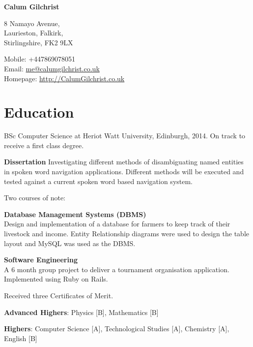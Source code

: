 \documentclass[11pt,a4paper]{article}
\def\name{Calum Gilchrist}
\renewenvironment{itemize}{
  \begin{list}{}{
    \setlength{\leftmargin}{1em}
    \setlength{\itemsep}{0.25em}
    \setlength{\parskip}{0pt}
    \setlength{\parsep}{0.25em}
    \renewcommand{\labelitemi}{$\bullet$}
  }
}{
  \end{list}
}
\begin{document}
%

\setlength{\parskip}{0em}


\centerline{\huge \bf \name}

\bigskip

\begin{minipage}[t]{0.495\textwidth}
  8 Namayo Avenue, \\
  Laurieston, Falkirk, \\
  Stirlingshire, FK2 9LX
\end{minipage}
\begin{minipage}[t]{0.495\textwidth}
  Mobile: +447869078051 \\
  Email: \href{mailto:me@calumgilchrist.co.uk}{me@calumgilchrist.co.uk} \\
  Homepage: \href{http://calumgilchrist.co.uk/}{http://CalumGilchrist.co.uk}
\end{minipage}

\section*{Education}

\begin{itemize}
    \item BSc Computer Science at Heriot Watt University, Edinburgh, 2014. On track to
      receive a first class degree.

    \begin{itemize}
        \item \textbf{Dissertation} Investigating different methods of disambiguating named
          entities in spoken word navigation applications. Different methods will be executed
          and tested against a current spoken word based navigation system.
        \item Two courses of note:
            \begin{itemize}
                \item \textbf{Database Management Systems (DBMS)} \\
                    Design and implementation of a database for farmers to keep track of their livestock and income.
                    Entity Relationship diagrams were used to design the table layout and MySQL was used as the DBMS.
                \item \textbf{Software Engineering} \\
                    A 6 month group project to deliver a tournament organisation application. Implemented using Ruby on Rails.
            \end{itemize}
        \item Received three Certificates of Merit. 
    \end{itemize}

    \item \textbf{Advanced Highers}: Physics [B], Mathematics [B]
    \item \textbf{Highers}: Computer Science [A], Technological Studies [A], Chemistry [A], English [B]
\end{itemize}
\end{document}

